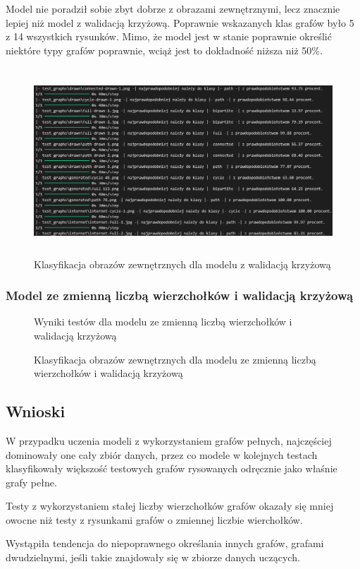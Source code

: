 Model nie poradził sobie zbyt dobrze z obrazami zewnętrznymi, lecz znacznie lepiej niż model z walidacją krzyżową.
Poprawnie wskazanych klas grafów było 5 z 14 wszystkich rysunków.
Mimo, że model jest w stanie poprawnie określić niektóre typy grafów poprawnie,
wciąż jest to dokładność niższa niż 50\%.

\begin{figure}[ht]
	\centering
	\includegraphics[height=7cm]{partials/images/tests/v2_multiple_edges_img_tests.png}
	\caption{Klasyfikacja obrazów zewnętrznych dla modelu z walidacją krzyżową}
\label{Fig:GraphUndirected}
\end{figure}
\FloatBarrier

\subsubsection{Model ze zmienną liczbą wierzchołków i walidacją krzyżową}

\begin{figure}[ht]
	\centering
	\caption{Wyniki testów dla modelu ze zmienną liczbą wierzchołków i walidacją krzyżową}
\label{Fig:GraphUndirected}
\end{figure}
\FloatBarrier

\begin{figure}[ht]
	\centering
	\caption{Klasyfikacja obrazów zewnętrznych dla modelu ze zmienną liczbą wierzchołków i walidacją krzyżową}
\label{Fig:GraphUndirected}
\end{figure}
\FloatBarrier

\subsection{Wnioski}
W przypadku uczenia modeli z wykorzystaniem grafów pełnych, najczęściej dominowały one cały zbiór danych,
przez co modele w kolejnych testach klasyfikowały większość testowych grafów rysowanych odręcznie jako właśnie grafy pełne.

Testy z wykorzystaniem stałej liczby wierzchołków grafów okazały się mniej owocne niż testy z rysunkami grafów
o zmiennej liczbie wierchołków.

Wystąpiła tendencja do niepoprawnego określania innych grafów, grafami dwudzielnymi, jeśli takie znajdowały się
w zbiorze danych uczących.
